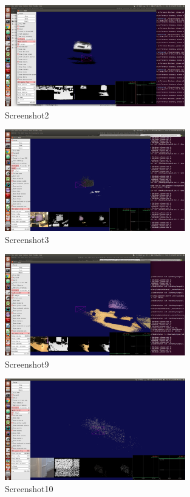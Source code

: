 \documentclass[12pt,twoside]{article}
\begin{document}
\begin{figure}[h]
    \centering
    \includegraphics[width=0.7\textwidth]{figures/Screenshot2}
    \caption{Screenshot2}
    \label{fig:Screenshot2}
\end{figure}

\begin{figure}[h]
    \centering
    \includegraphics[width=0.7\textwidth]{figures/Screenshot3}
    \caption{Screenshot3}
    \label{fig:Screenshot3}
\end{figure}

\begin{figure}[h]
    \centering
    \includegraphics[width=0.7\textwidth]{figures/Screenshot9}
    \caption{Screenshot9}
    \label{fig:Screenshot9}
\end{figure}


\begin{figure}[h]
    \centering
    \includegraphics[width=0.7\textwidth]{figures/Screenshot10}
    \caption{Screenshot10}
    \label{fig:Screenshot10}
\end{figure}
\end{document}
